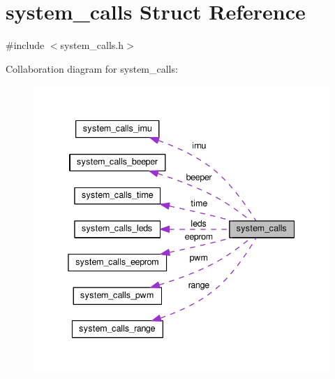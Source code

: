 \hypertarget{structsystem__calls}{\section{system\+\_\+calls Struct Reference}
\label{structsystem__calls}
}


{\ttfamily \#include $<$system\+\_\+calls.\+h$>$}



Collaboration diagram for system\+\_\+calls\+:\nopagebreak
\begin{figure}[H]
\begin{center}
\leavevmode
\includegraphics[width=338pt]{structsystem__calls__coll__graph}
\end{center}
\end{figure}
